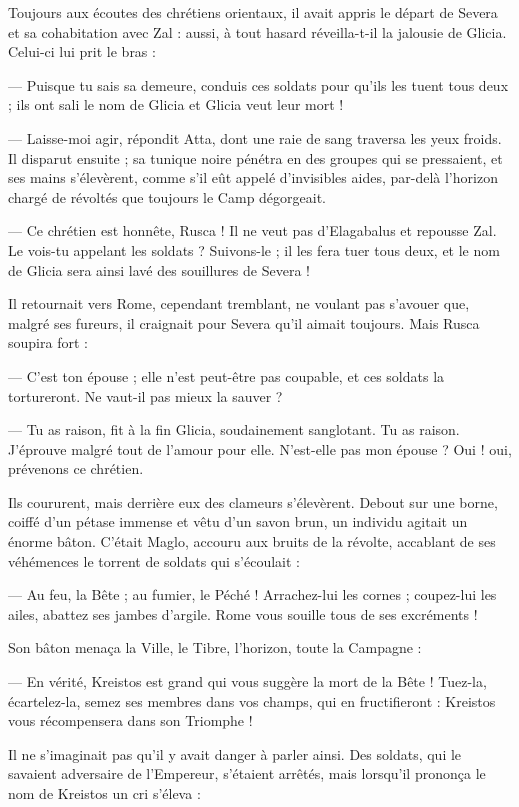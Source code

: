 \documentclass[a4paper, 11pt, oneside, polutonikogreek, french]{article}
\begin{document}
Toujours aux écoutes des chrétiens orientaux, il avait appris le départ de Severa et sa cohabitation avec Zal : aussi, à tout hasard réveilla-t-il la jalousie de Glicia. Celui-ci lui prit le bras :

--- Puisque tu sais sa demeure, conduis ces soldats pour qu'ils les tuent tous deux ; ils ont sali le nom de Glicia et Glicia veut leur mort !

--- Laisse-moi agir, répondit Atta, dont une raie de sang traversa les yeux froids. Il disparut ensuite ; sa tunique noire pénétra en des groupes qui se pressaient, et ses mains s'élevèrent, comme s'il eût appelé d'invisibles aides, par-delà l'horizon chargé de révoltés que toujours le Camp dégorgeait.

--- Ce chrétien est honnête, Rusca ! Il ne veut pas d'Elagabalus et repousse Zal. Le vois-tu appelant les soldats ? Suivons-le ; il les fera tuer tous deux, et le nom de Glicia sera ainsi lavé des souillures de Severa !

Il retournait vers Rome, cependant tremblant, ne voulant pas s'avouer que, malgré ses fureurs, il craignait pour Severa qu'il aimait toujours. Mais Rusca soupira fort :

--- C'est ton épouse ; elle n'est peut-être pas coupable, et ces soldats la tortureront. Ne vaut-il pas mieux la sauver ?

--- Tu as raison, fit à la fin Glicia, soudainement sanglotant. Tu as raison. J'éprouve malgré tout de l'amour pour elle. N'est-elle pas mon épouse ? Oui ! oui, prévenons ce chrétien.

Ils coururent, mais derrière eux des clameurs s'élevèrent. Debout sur une borne, coiffé d'un pétase immense et vêtu d'un savon brun, un individu agitait un énorme bâton. C'était Maglo, accouru aux bruits de la révolte, accablant de ses véhémences le torrent de soldats qui s'écoulait :

--- Au feu, la Bête ; au fumier, le Péché ! Arrachez-lui les cornes ; coupez-lui les ailes, abattez ses jambes d'argile. Rome vous souille tous de ses excréments !

Son bâton menaça la Ville, le Tibre, l'horizon, toute la Campagne :

--- En vérité, Kreistos est grand qui vous suggère la mort de la Bête ! Tuez-la, écartelez-la, semez ses membres dans vos champs, qui en fructifieront : Kreistos vous récompensera dans son Triomphe !

Il ne s'imaginait pas qu'il y avait danger à parler ainsi. Des soldats, qui le savaient adversaire de l'Empereur, s'étaient arrêtés, mais lorsqu'il prononça le nom de Kreistos un cri s'éleva :
\end{document}
